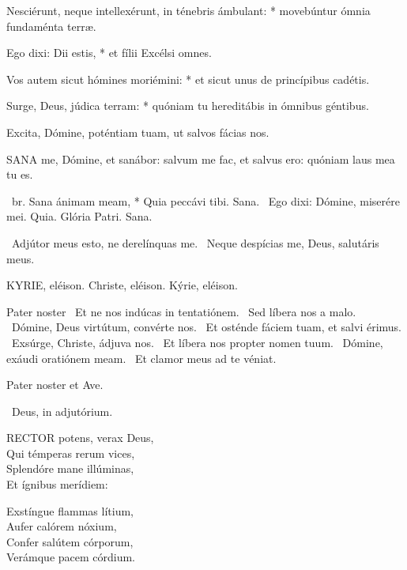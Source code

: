 Nesciérunt, neque intellexérunt, in ténebris ámbulant: * movebúntur ómnia fundaménta terræ.

Ego dixi: Dii estis, * et fílii Excélsi omnes.

Vos autem sicut hómines moriémini: * et sicut unus de princípibus cadétis.

Surge, Deus, júdica terram: * quóniam tu hereditábis in ómnibus géntibus.

 Excita, Dómine, poténtiam tuam, ut salvos fácias nos.



\lettrine[lines=2]{S}{ANA} me, Dómine, et sanábor: salvum me fac, et salvus ero: quóniam laus mea tu es.

\R\ br. Sana ánimam meam, * Quia peccávi tibi. Sana. \V\ Ego dixi: Dómine, miserére mei. Quia. Glória Patri. Sana.

\V\ Adjútor meus esto, ne derelínquas me. \R\ Neque despícias me, Deus, salutáris meus.



KYRIE, eléison. Christe, eléison. Kýrie, eléison.

Pater noster  \V\ Et ne nos indúcas in tentatiónem. \R\ Sed líbera nos a malo. \V\ Dómine, Deus virtútum, convérte nos. \R\ Et osténde fáciem tuam, et salvi érimus. \V\ Exsúrge, Christe, ádjuva nos. \R\ Et líbera nos propter nomen tuum. \V\ Dómine, exáudi oratiónem meam. \R\ Et clamor meus ad te véniat.



Pater noster et Ave.

\V\ Deus, in adjutórium.


\lettrine[lines=2]{R}{ECTOR} potens, verax Deus,\\
Qui témperas rerum vices,\\
Splendóre mane illúminas,\\
Et ígnibus merídiem:

Exstíngue flammas lítium,\\
Aufer calórem nóxium,\\
Confer salútem córporum,\\
Verámque pacem córdium.

